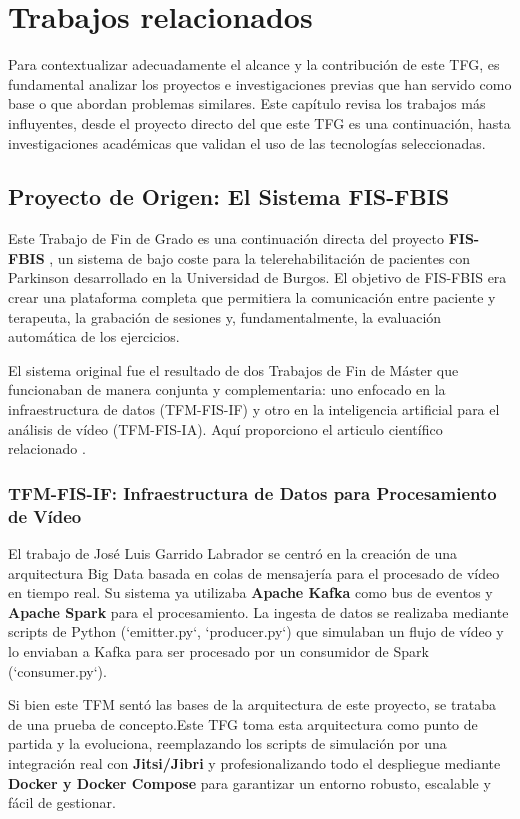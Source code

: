 \chapter{Trabajos relacionados}
\label{chap:trabajos_relacionados}

Para contextualizar adecuadamente el alcance y la contribución de este TFG, es fundamental analizar los proyectos e investigaciones previas que han servido como base o que abordan problemas similares. Este capítulo revisa los trabajos más influyentes, desde el proyecto directo del que este TFG es una continuación, hasta investigaciones académicas que validan el uso de las tecnologías seleccionadas.

\section{Proyecto de Origen: El Sistema FIS-FBIS}
\label{sec:trab_rel_fisfbis}
Este Trabajo de Fin de Grado es una continuación directa del proyecto \textbf{FIS-FBIS} \cite{garrido_fisfbis}, un sistema de bajo coste para la telerehabilitación de pacientes con Parkinson desarrollado en la Universidad de Burgos. El objetivo de FIS-FBIS era crear una plataforma completa que permitiera la comunicación entre paciente y terapeuta, la grabación de sesiones y, fundamentalmente, la evaluación automática de los ejercicios.

El sistema original fue el resultado de dos Trabajos de Fin de Máster que funcionaban de manera conjunta y complementaria: uno enfocado en la infraestructura de datos (TFM-FIS-IF) y otro en la inteligencia artificial para el análisis de vídeo (TFM-FIS-IA). Aquí proporciono el articulo científico relacionado \cite{garrido2023fishub}.

\subsection{TFM-FIS-IF: Infraestructura de Datos para Procesamiento de Vídeo}
El trabajo de José Luis Garrido Labrador \cite{garrido_tfm_if} se centró en la creación de una arquitectura Big Data basada en colas de mensajería para el procesado de vídeo en tiempo real. Su sistema ya utilizaba \textbf{Apache Kafka} como bus de eventos y \textbf{Apache Spark} para el procesamiento. La ingesta de datos se realizaba mediante scripts de Python (`emitter.py`, `producer.py`) que simulaban un flujo de vídeo y lo enviaban a Kafka para ser procesado por un consumidor de Spark (`consumer.py`).

Si bien este TFM sentó las bases de la arquitectura de este proyecto, se trataba de una prueba de concepto.Este TFG toma esta arquitectura como punto de partida y la evoluciona, reemplazando los scripts de simulación por una integración real con \textbf{Jitsi/Jibri} y profesionalizando todo el despliegue mediante \textbf{Docker y Docker Compose} para garantizar un entorno robusto, escalable y fácil de gestionar.

